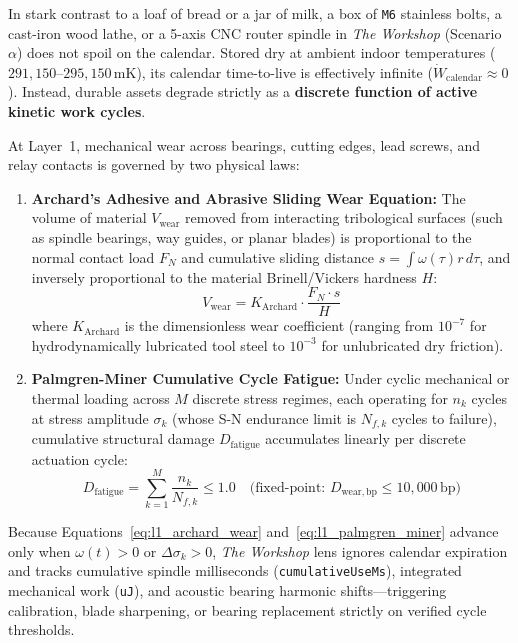 In stark contrast to a loaf of bread or a jar of milk, a box of \texttt{M6} stainless bolts, a cast-iron wood lathe, or a 5-axis CNC router spindle in \textit{The Workshop} (Scenario~$\alpha$) does not spoil on the calendar. Stored dry at ambient indoor temperatures ($291{,}150\text{--}295{,}150\,\mathrm{mK}$), its calendar time-to-live is effectively infinite ($\dot{W}_{\mathrm{calendar}} \approx 0$). Instead, durable assets degrade strictly as a \textbf{discrete function of active kinetic work cycles}.

At Layer~1, mechanical wear across bearings, cutting edges, lead screws, and relay contacts is governed by two physical laws:
\begin{enumerate}
    \item \textbf{Archard's Adhesive and Abrasive Sliding Wear Equation:} The volume of material $V_{\mathrm{wear}}$ removed from interacting tribological surfaces (such as spindle bearings, way guides, or planar blades) is proportional to the normal contact load $F_N$ and cumulative sliding distance $s = \int \omega(\tau) r \, d\tau$, and inversely proportional to the material Brinell/Vickers hardness $H$:
    \begin{equation}
    V_{\mathrm{wear}} = K_{\mathrm{Archard}} \cdot \frac{F_N \cdot s}{H}
    \label{eq:l1_archard_wear}
    \end{equation}
    where $K_{\mathrm{Archard}}$ is the dimensionless wear coefficient (ranging from $10^{-7}$ for hydrodynamically lubricated tool steel to $10^{-3}$ for unlubricated dry friction).
    \item \textbf{Palmgren-Miner Cumulative Cycle Fatigue:} Under cyclic mechanical or thermal loading across $M$ discrete stress regimes, each operating for $n_k$ cycles at stress amplitude $\sigma_k$ (whose S-N endurance limit is $N_{f,k}$ cycles to failure), cumulative structural damage $D_{\mathrm{fatigue}}$ accumulates linearly per discrete actuation cycle:
    \begin{equation}
    D_{\mathrm{fatigue}} = \sum_{k=1}^{M} \frac{n_k}{N_{f,k}} \le 1.0 \quad \bigl(\text{fixed-point: } D_{\mathrm{wear,bp}} \le 10{,}000\,\mathrm{bp}\bigr)
    \label{eq:l1_palmgren_miner}
    \end{equation}
\end{enumerate}
Because Equations~\eqref{eq:l1_archard_wear} and~\eqref{eq:l1_palmgren_miner} advance only when $\omega(t) > 0$ or $\Delta \sigma_k > 0$, \textit{The Workshop} lens ignores calendar expiration and tracks cumulative spindle milliseconds (\texttt{cumulativeUseMs}), integrated mechanical work (\texttt{uJ}), and acoustic bearing harmonic shifts---triggering calibration, blade sharpening, or bearing replacement strictly on verified cycle thresholds.

